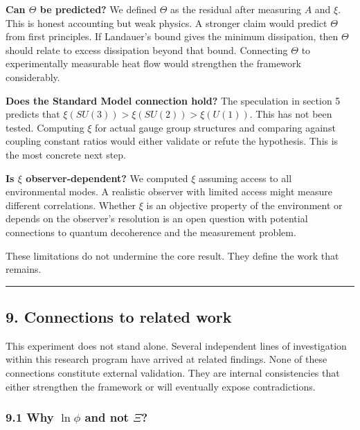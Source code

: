 \documentclass[
  11pt,
  a4paper]{article}
\begin{document}
\textbf{Can \(\Theta\) be predicted?} We defined \(\Theta\) as the
residual after measuring \(A\) and \(\xi\). This is honest accounting
but weak physics. A stronger claim would predict \(\Theta\) from first
principles. If Landauer's bound gives the minimum dissipation, then
\(\Theta\) should relate to excess dissipation beyond that bound.
Connecting \(\Theta\) to experimentally measurable heat flow would
strengthen the framework considerably.

\textbf{Does the Standard Model connection hold?} The speculation in
section 5 predicts that \(\xi(SU(3)) > \xi(SU(2)) > \xi(U(1))\). This
has not been tested. Computing \(\xi\) for actual gauge group structures
and comparing against coupling constant ratios would either validate or
refute the hypothesis. This is the most concrete next step.

\textbf{Is \(\xi\) observer-dependent?} We computed \(\xi\) assuming
access to all environmental modes. A realistic observer with limited
access might measure different correlations. Whether \(\xi\) is an
objective property of the environment or depends on the observer's
resolution is an open question with potential connections to quantum
decoherence and the measurement problem.

These limitations do not undermine the core result. They define the work
that remains.

\begin{center}\rule{0.5\linewidth}{0.5pt}\end{center}

\subsection{9. Connections to related
work}\label{connections-to-related-work}

This experiment does not stand alone. Several independent lines of
investigation within this research program have arrived at related
findings. None of these connections constitute external validation. They
are internal consistencies that either strengthen the framework or will
eventually expose contradictions.

\subsubsection{\texorpdfstring{9.1 Why \(\ln\phi\) and not
\(\Xi\)?}{9.1 Why \textbackslash ln\textbackslash phi and not \textbackslash Xi?}}\label{why-lnphi-and-not-xi}
\end{document}
